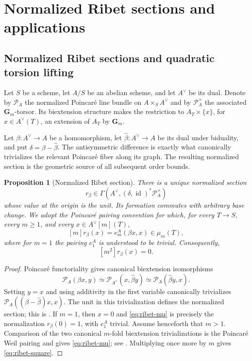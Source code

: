 \documentclass[11pt,letterpaper,reqno]{amsart}
\newtheorem{proposition}[theorem]{Proposition}
\theoremstyle{definition}
\theoremstyle{remark}
\newcommand{\Gm}{\mathbf G_m}
\newcommand{\id}{\operatorname{id}}
\newcommand{\cP}{\mathcal P}
\begin{document}
\section{Normalized Ribet sections and applications}\label{sec:ribet}
\subsection{Normalized Ribet sections and quadratic torsion lifting}


Let $S$ be a scheme, let $A/S$ be an abelian scheme, and let $A^\vee$ be its
dual.  Denote by $\cP_A$ the normalized Poincar\'e line bundle on
$A\times_S A^\vee$ and by $\cP_A^\times$ the associated $\Gm$-torsor.
Its biextension structure makes the restriction to $A_T\times\{x\}$, for
$x\in A^\vee(T)$, an extension of $A_T$ by $\Gm$.

Let $\beta:A^\vee\to A$ be a homomorphism, let
$\widehat\beta:A^\vee\to A$ be its dual under biduality, and put
$\delta=\beta-\widehat\beta$.  The antisymmetric difference is exactly
what canonically trivializes the relevant Poincar\'e fiber along its graph.
The resulting normalized section is the geometric source of all subsequent
order bounds.

\begin{proposition}[Normalized Ribet section]
\label{prop:ribet-point}
There is a unique normalized section
\[
 r_\beta\in
 \Gamma\!\left(A^\vee,(\delta,\id)^*\cP_A^\times\right)
\]
whose value at the origin is the unit.  Its formation commutes with arbitrary
base change.  We adopt the Poincar\'e pairing convention for which, for every
$T\to S$, every $m\ge1$, and every $x\in A^\vee[m](T)$,
\begin{equation}\label{eq:ribet-mu}
 [m]r_\beta(x)=e_m^A(\beta x,x)\in\mu_m(T),
\end{equation}
where for $m=1$ the pairing $e_1^A$ is understood to be trivial.  Consequently,
\begin{equation}\label{eq:ribet-square}
 [m^2]r_\beta(x)=0.
\end{equation}
\end{proposition}

\begin{proof}
Poincar\'e functoriality gives canonical biextension isomorphisms
\[
 \cP_A(\beta x,y)
 \simeq\cP_{A^\vee}(x,\widehat\beta y)
 \simeq\cP_A(\widehat\beta y,x).
\]
Setting $y=x$ and using additivity in the first variable canonically
trivializes $\cP_A((\beta-\widehat\beta)x,x)$.  The unit in this
trivialization defines the normalized section; this is
\cite[Proposition~3.1]{BertrandEdixhoven2020}.  If $m=1$, then $x=0$ and
\eqref{eq:ribet-mu} is precisely the normalization $r_\beta(0)=1$, with
$e_1^A$ trivial.  Assume henceforth that $m>1$.  Comparison of the two
canonical $m$-fold biextension trivializations is the Poincar\'e Weil pairing
and gives \eqref{eq:ribet-mu}; see
\cite[Proposition~3.3]{BertrandEdixhoven2020}.  Multiplying once more by $m$
gives \eqref{eq:ribet-square}.
\end{proof}
\end{document}
